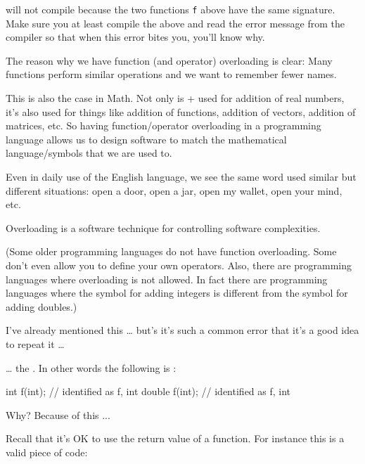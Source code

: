 will not compile because the two functions \texttt{f} above have the same signature. Make sure you at least compile the above and read the error message from the compiler so that when this error bites you, you'll know why.



\newpage{}

The reason why we have function (and operator) overloading is clear: Many functions perform similar operations and we want to remember fewer names.

This is also the case in Math. Not only is + used for addition of real numbers, it's also used for things like addition of functions, addition of vectors, addition of matrices, etc. So having function/operator overloading in a programming language allows us to design software to match the mathematical language/symbols that we are used to.

Even in daily use of the English language, we see the same word used similar but different situations: open a door, open a jar, open my wallet, open your mind, etc.

Overloading is a software technique for controlling software complexities.

(Some older programming languages do not have function overloading. Some don't even allow you to define your own operators. Also, there are programming languages where overloading is not allowed. In fact there are programming languages where the symbol for adding integers is different from the symbol for adding doubles.)

\newpage{}

I've already mentioned this \ldots{} but's it's such a common error that it's a good idea to repeat it \ldots{}

\ldots{} the . In other words the following is :

\begin{consolethree}[escapeinside=||]
int f(int);    // identified as f, int
double f(int); // identified as f, int
\end{consolethree}

Why? Because of this ...

Recall that it's OK \textit{} to use the return value of a function. For instance this is a valid piece of code:

